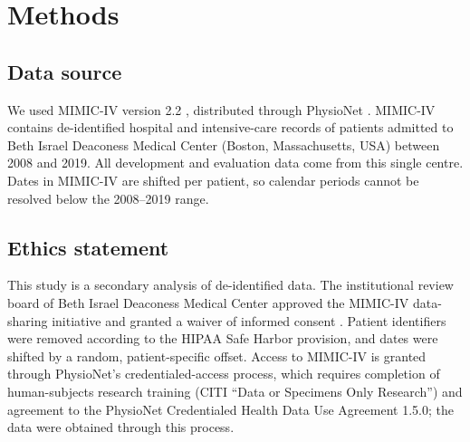 
\section{Methods}

\subsection{Data source} \label{sec:data}
We used MIMIC-IV version 2.2 \citep{mimiciv_v22,johnson2023mimic_ehr}, distributed through PhysioNet \citep{goldberger2000physionet}. MIMIC-IV contains de-identified hospital and intensive-care records of patients admitted to Beth Israel Deaconess Medical Center (Boston, Massachusetts, USA) between 2008 and 2019. All development and evaluation data come from this single centre. Dates in MIMIC-IV are shifted per patient, so calendar periods cannot be resolved below the 2008--2019 range.

\subsection{Ethics statement} \label{sec:ethics}
This study is a secondary analysis of de-identified data. The institutional review board of Beth Israel Deaconess Medical Center approved the MIMIC-IV data-sharing initiative and granted a waiver of informed consent \citep{johnson2023mimic_ehr,mimiciv_v22}. Patient identifiers were removed according to the HIPAA Safe Harbor provision, and dates were shifted by a random, patient-specific offset. Access to MIMIC-IV is granted through PhysioNet's credentialed-access process, which requires completion of human-subjects research training (CITI ``Data or Specimens Only Research'') and agreement to the PhysioNet Credentialed Health Data Use Agreement 1.5.0; the data were obtained through this process.


